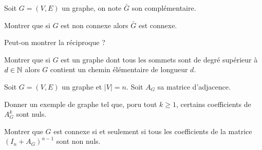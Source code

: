 \documentclass[french]{report}
\begin{document}
\begin{exo}
    Soit \(G=(V,E)\) un graphe, on note \(\bar{G}\) son complémentaire.
    \begin{q}{1}
        Montrer que si \(G\) est non connexe alors \(\bar{G}\) est connexe.
    \end{q}
    \begin{q}{2}
        Peut-on montrer la réciproque ?
    \end{q}
\end{exo}

\begin{exo}
    Montrer que si \(G\) est un graphe dont tous les sommets sont de degré supérieur
    à \(d\in\mathbb{N}\) alors \(G\) contient un chemin élémentaire de longueur \(d\).
\end{exo}

\begin{exo}
    Soit \(G=(V,E)\) un graphe et \(|V|=n\). Soit \(A_G\) sa matrice d'adjacence.
    \begin{q}{1}
        Donner un exemple de graphe tel que, poru tout \(k\geq 1\), certains
        coefficients de \(A_G^k\) sont nuls.
    \end{q}
    \begin{q}{2}
        Montrer que \(G\) est connexe si et seulement si tous les coefficients
        de la matrice \(\left(I_n+A_G\right)^{n-1}\) sont non nuls.
    \end{q}
\end{exo}
\end{document}
